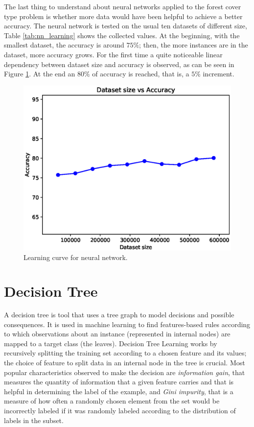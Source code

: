 \documentclass[a4paper, 10pt]{article}
\begin{document}
The last thing to understand about neural networks applied to the forest cover type problem is whether more data would have been helpful to achieve a better accuracy. The neural network is tested on the usual ten datasets of different size, Table \ref{tab:nn_learning} shows the collected values. At the beginning, with the smallest dataset,  the accuracy is around $75\%$; then, the more instances are in the dataset, more accuracy grows. For the first time a quite noticeable linear dependency between dataset size and accuracy is observed, as can be seen in Figure \ref{fig:nn_learning}. At the end an $80\%$ of accuracy is reached, that is, a $5\%$ increment.

\begin{figure}[H]
 \centering
 \includegraphics[width=0.8\linewidth]{pictures/nn_size_vs_accuracy.eps}
 \caption{Learning curve for neural network.}
 \label{fig:nn_learning}
\end{figure}

\section{Decision Tree}

A decision tree is tool that uses a tree graph to model decisions and possible consequences. It is used in machine learning to find features-based rules according to which observations about an instance (represented in internal nodes) are mapped to a target class (the leaves). Decision Tree Learning works by recursively splitting the training set according to a chosen feature and its values; the choice of feature to split data in an internal node in the tree is crucial. Most popular characteristics observed to make the decision are \emph{information gain}, that measures the quantity of information that a given feature carries and that is helpful in determining the label of the example, and \emph{Gini impurity}, that is a measure of how often a randomly chosen element from the set would be incorrectly labeled if it was randomly labeled according to the distribution of labels in the subset.
\end{document}
